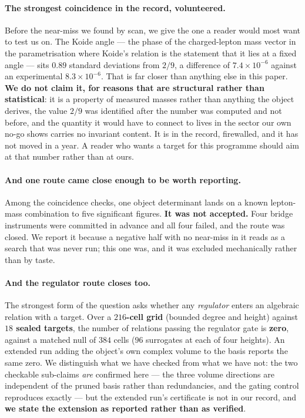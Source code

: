 \documentclass[11pt,a4paper]{article}
\theoremstyle{definition}
\theoremstyle{remark}
\begin{document}
\paragraph{The strongest coincidence in the record, volunteered.} Before the near-miss we found by scan,
we give the one a reader would most want to test us on. The Koide angle --- the phase of the charged-lepton mass
vector in the parametrisation where Koide's relation is the statement that it lies at a fixed angle --- sits
$0.89$ standard deviations from $2/9$, a difference of $7.4 \times 10^{-6}$ against an experimental $8.3 \times 10^{-6}$.
That is far closer than anything else in this paper. \textbf{We do not claim it, for reasons that are structural rather
than statistical}: it is a property of measured masses rather than anything the object derives, the value $2/9$ was
identified after the number was computed and not before, and the quantity it would have to connect to lives in the
sector our own no-go shows carries no invariant content. It is in the record, firewalled, and it has not moved in a
year. A reader who wants a target for this programme should aim at that number rather than at ours.

\paragraph{And one route came close enough to be worth reporting.} Among the coincidence checks, one
object determinant lands on a known lepton-mass combination to five significant figures. \textbf{It
was not accepted.} Four bridge instruments were committed in advance and all four failed, and the
route was closed. We report it because a negative half with no near-miss in it reads as a search that
was never run; this one was, and it was excluded mechanically rather than by taste.

\paragraph{And the regulator route closes too.} The strongest form of the question asks whether any
\emph{regulator} enters an algebraic relation with a target. Over a \textbf{$216$-cell grid} (bounded degree and height) against \textbf{$18$ sealed
targets}, the number of relations passing the regulator gate is \textbf{zero}, against a matched null
of $384$ cells ($96$ surrogates at each of four heights). An extended run adding the object's own complex volume to the basis reports the same zero. We
distinguish what we have checked from what we have not: the two checkable sub-claims \emph{are}
confirmed here --- the three volume directions are independent of the pruned basis rather than
redundancies, and the gating control reproduces exactly --- but the extended run's certificate is not
in our record, and \textbf{we state the extension as reported rather than as verified}.
\end{document}
